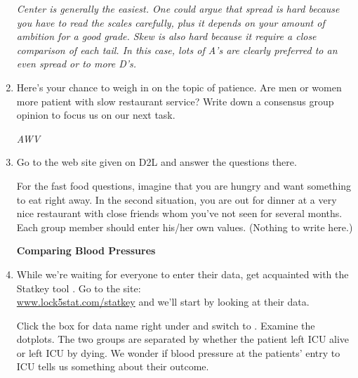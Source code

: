 \begin{enumerate}
\begin{key}
  {\it  Center is generally the easiest.  One could argue that spread
    is hard because you have to read the scales carefully, plus it
    depends on your amount of ambition for a good grade.  Skew is also
  hard because it require a close comparison of each tail. In this
  case, lots of A's are clearly preferred to an even spread or to more
D's.}
\end{key}


  \item  Here's your chance to weigh in on the topic of patience.  Are
    men or women more patient with slow restaurant service?  Write
    down a consensus group opinion to focus us on our next
    task.
\begin{students}
    \vspace{2cm}    
\end{students}

\begin{key}
  {\it AWV}
\end{key}

  \item  Go to the web site given on D2L and answer the questions there.
 
    For the fast food questions, imagine that you are hungry and want
    something to eat right away.  In the second situation, you are out
    for dinner at a very nice restaurant with close friends whom
    you've not seen for several months. Each group member should enter
    his/her own values.  (Nothing to write here.)


  \begin{center}
    {\bf  Comparing Blood Pressures}
  \end{center}
\item  While we're waiting for everyone to enter their data, get
  acquainted with the Statkey tool . Go to the site:\\
  \url{www.lock5stat.com/statkey} and we'll
  start by looking at their data.  
  
  Click the box for data name 
  right under  and switch to 
  . 
  Examine the dotplots. The two groups are separated by
  whether the patient left ICU alive or left ICU by dying. We wonder
  if blood pressure at the patients’ entry to ICU tells us something
  about their outcome.  


\end{enumerate}
